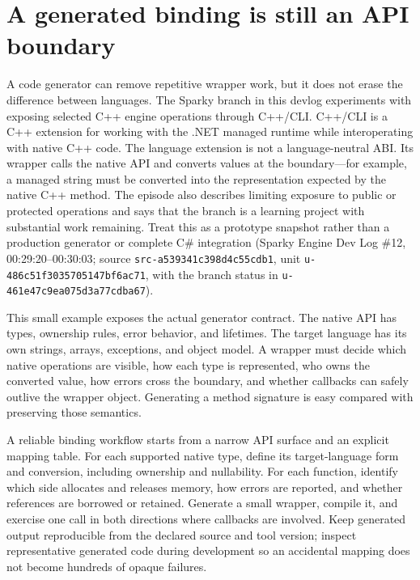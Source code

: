 \section{A generated binding is still an API boundary}\label{05-engine-i-ch024-a-generated-binding-is-still-an-api-boundary}

A code generator can remove repetitive wrapper work, but it does not erase the difference between languages. The Sparky branch in this devlog experiments with exposing selected C++ engine operations through C++/CLI. C++/CLI is a C++ extension for working with the .NET managed runtime while interoperating with native C++ code. The language extension is not a language-neutral ABI. Its wrapper calls the native API and converts values at the boundary---for example, a managed string must be converted into the representation expected by the native C++ method. The episode also describes limiting exposure to public or protected operations and says that the branch is a learning project with substantial work remaining. Treat this as a prototype snapshot rather than a production generator or complete C\# integration (Sparky Engine Dev Log \#12, 00:29:20--00:30:03; source \texttt{src-a539341c398d4c55cdb1}, unit \texttt{u-486c51f3035705147bf6ac71}, with the branch status in \texttt{u-461e47c9ea075d3a77cdba67}).

This small example exposes the actual generator contract. The native API has types, ownership rules, error behavior, and lifetimes. The target language has its own strings, arrays, exceptions, and object model. A wrapper must decide which native operations are visible, how each type is represented, who owns the converted value, how errors cross the boundary, and whether callbacks can safely outlive the wrapper object. Generating a method signature is easy compared with preserving those semantics.

A reliable binding workflow starts from a narrow API surface and an explicit mapping table. For each supported native type, define its target-language form and conversion, including ownership and nullability. For each function, identify which side allocates and releases memory, how errors are reported, and whether references are borrowed or retained. Generate a small wrapper, compile it, and exercise one call in both directions where callbacks are involved. Keep generated output reproducible from the declared source and tool version; inspect representative generated code during development so an accidental mapping does not become hundreds of opaque failures.

